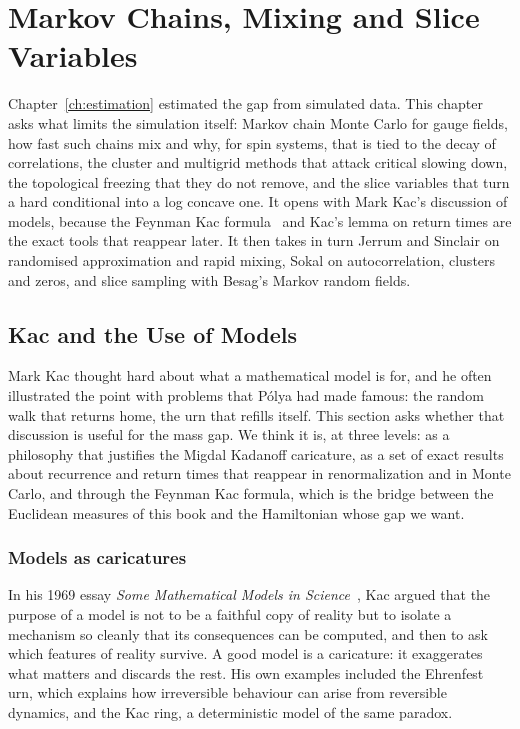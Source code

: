 \chapter{Markov Chains, Mixing and Slice Variables}\label{ch:kac}

Chapter~\ref{ch:estimation} estimated the gap from simulated data. This chapter asks what limits the simulation itself: Markov chain Monte Carlo for gauge fields, how fast such chains mix and why, for spin systems, that is tied to the decay of correlations, the cluster and multigrid methods that attack critical slowing down, the topological freezing that they do not remove, and the slice variables that turn a hard conditional into a log concave one. It opens with Mark Kac's discussion of models, because the Feynman Kac formula~\cite{Ka49} and Kac's lemma on return times are the exact tools that reappear later. It then takes in turn Jerrum and Sinclair on randomised approximation and rapid mixing, Sokal on autocorrelation, clusters and zeros, and slice sampling with Besag's Markov random fields.

\section{Kac and the Use of Models}\label{sec:c5kac}

Mark Kac thought hard about what a mathematical model is for, and he often illustrated the point with problems that P\'olya had made famous: the random walk that returns home, the urn that refills itself. This section asks whether that discussion is useful for the mass gap. We think it is, at three levels: as a philosophy that justifies the Migdal Kadanoff caricature, as a set of exact results about recurrence and return times that reappear in renormalization and in Monte Carlo, and through the Feynman Kac formula, which is the bridge between the Euclidean measures of this book and the Hamiltonian whose gap we want.

\subsection{Models as caricatures}

In his 1969 essay \emph{Some Mathematical Models in Science}~\cite{Ka69}, Kac argued that the purpose of a model is not to be a faithful copy of reality but to isolate a mechanism so cleanly that its consequences can be computed, and then to ask which features of reality survive. A good model is a caricature: it exaggerates what matters and discards the rest. His own examples included the Ehrenfest urn, which explains how irreversible behaviour can arise from reversible dynamics, and the Kac ring, a deterministic model of the same paradox.

